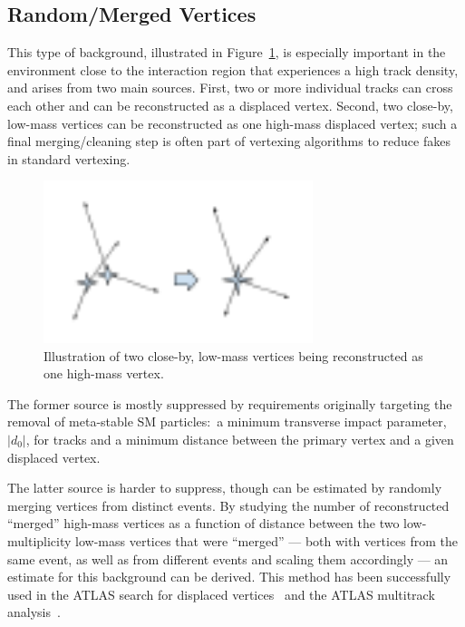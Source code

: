 \subsection{Random/Merged Vertices}

This type of background, illustrated in Figure~\ref{fig:mergedvertices}, is especially important in the environment close to the interaction region that experiences a high track density, and arises from two main sources. First, two or more individual tracks can cross each other and can be reconstructed as a displaced vertex. Second, two close-by, low-mass vertices can be reconstructed as one high-mass displaced vertex; such a final merging/cleaning step is often part of vertexing algorithms to reduce fakes in standard vertexing.

\begin{figure}[h]
  \centering
  \includegraphics[width=0.7\textwidth]{figures/mergedvertices.pdf}
  \caption{Illustration of two close-by, low-mass vertices being reconstructed as one high-mass vertex.}
  \label{fig:mergedvertices}
\end{figure}

The former source is mostly suppressed by requirements originally targeting the removal of meta-stable SM particles:~a minimum transverse impact parameter, $|d_0|$, for tracks and a minimum distance between the primary vertex and a given displaced vertex.

The latter source is harder to suppress, though can be estimated by randomly merging vertices from distinct events. By studying the number of reconstructed ``merged'' high-mass vertices as a function of distance between the two low-multiplicity low-mass vertices that were ``merged'' --- both with vertices from the same event, as well as from different events and scaling them accordingly --- an estimate for this background can be derived. This method has been successfully used in the ATLAS search for displaced vertices~\cite{Aaboud:2017iio} and the ATLAS multitrack analysis~\cite{Aad:2015rba}.

